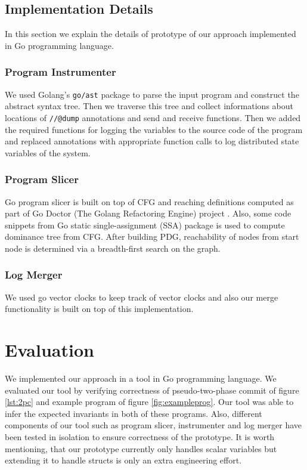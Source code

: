 \subsection{Implementation Details}

In this section we explain the details of prototype of our approach implemented in Go programming language.

\subsubsection{Program Instrumenter}

We used Golang's \texttt{go/ast} package to parse the input program and construct the abstract syntax tree. Then we traverse this tree and collect informations about locations of \texttt{//@dump} annotations and send and receive functions. Then we added the required functions for logging the variables to the source code of the program and replaced annotations with appropriate function calls to log distributed state variables of the system. 

\subsubsection{Program Slicer}

Go program slicer is built on top of CFG and reaching definitions computed as part of Go Doctor (The Golang Refactoring Engine) project \cite{godoctor}. Also, some code snippets from Go static single-assignment (SSA) package \cite{ssa} is used to compute dominance tree from CFG. After building PDG, reachability of nodes from start node is determined via a breadth-first search on the graph.

\subsubsection{Log Merger}

We used go vector clocks \cite{vclock} to keep track of vector clocks and also our merge functionality is built on top of this implementation. 


\section{Evaluation}
We implemented our approach in a tool in Go programming language. We evaluated our tool by verifying correctness of pseudo-two-phase commit of figure \ref{lst:2pc} and example program of figure \ref{fig:exampleprog}. Our tool was able to infer the expected invariants in both of these programs. Also, different components of our tool such as program slicer, instrumenter and log merger have been tested in isolation to ensure correctness of the prototype. It is worth mentioning, that our prototype currently only handles scalar variables but extending it to handle structs is only an extra engineering effort. %

